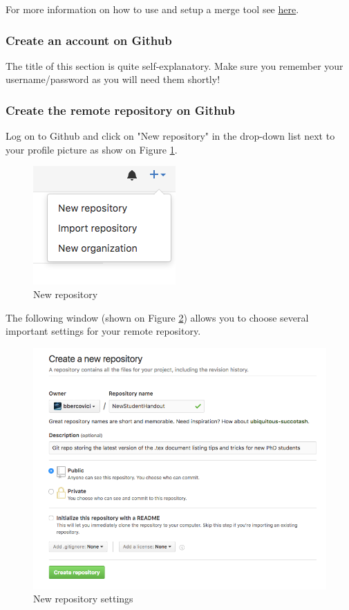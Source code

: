 \noindent
For more information on how to use and setup a merge tool see \href{https://git-scm.com/docs/git-mergetool}{here}.


\subsubsection{Create an account on Github}
The title of this section is quite self-explanatory. Make sure you remember your username/password as you will need them shortly!
\subsubsection{Create the remote repository on Github}
Log on to Github and click on "New repository" in the drop-down list next to your profile picture as show on Figure \ref{fig:new_repo}.
\begin{figure}[H]
\centering
\includegraphics[scale=0.5]{new_repo}
\caption{New repository}
\label{fig:new_repo}
\end{figure}

The following window (shown on Figure \ref{fig:new_repo_settings}) allows you to choose several important settings for your remote repository.
\begin{figure}[H]
\centering
\includegraphics[scale=0.6]{new_repo_settings}
\caption{New repository settings}
\label{fig:new_repo_settings}
\end{figure}

